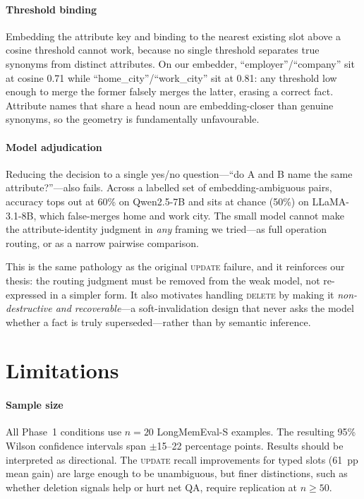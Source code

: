 \documentclass[10pt, twocolumn]{article}
\begin{document}
\paragraph{Threshold binding}
Embedding the attribute key and binding to the nearest existing slot above a
cosine threshold cannot work, because no single threshold separates true
synonyms from distinct attributes. On our embedder,
``employer''/``company'' sit at cosine 0.71 while
``home\_city''/``work\_city'' sit at 0.81: any threshold low enough to merge the
former falsely merges the latter, erasing a correct fact. Attribute names that
share a head noun are embedding-closer than genuine synonyms, so the geometry is
fundamentally unfavourable.

\paragraph{Model adjudication}
Reducing the decision to a single yes/no question---``do A and B name the same
attribute?''---also fails. Across a labelled set of embedding-ambiguous pairs,
accuracy tops out at 60\% on Qwen2.5-7B and sits at chance (50\%) on
LLaMA-3.1-8B, which false-merges home and work city. The small model cannot make
the attribute-identity judgment in \emph{any} framing we tried---as full
operation routing, or as a narrow pairwise comparison.

This is the same pathology as the original \textsc{update} failure, and it
reinforces our thesis: the routing judgment must be removed from the weak model,
not re-expressed in a simpler form. It also motivates handling \textsc{delete}
by making it \emph{non-destructive and recoverable}---a soft-invalidation design
that never asks the model whether a fact is truly superseded---rather than by
semantic inference.

\section{Limitations}
\label{sec:limitations}

\paragraph{Sample size}
All Phase~1 conditions use $n=20$ LongMemEval-S examples.
The resulting 95\% Wilson confidence intervals span $\pm$15--22 percentage
points.
Results should be interpreted as directional.
The \textsc{update} recall improvements for typed slots (61~pp mean gain)
are large enough to be unambiguous, but finer distinctions, such as whether
deletion signals help or hurt net QA, require replication at $n \geq 50$.
\end{document}
